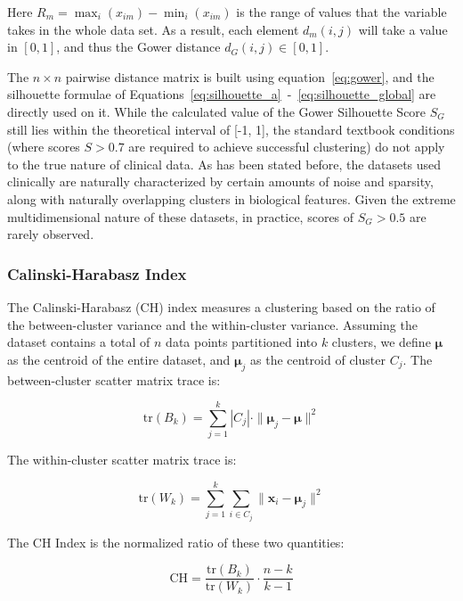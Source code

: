 Here $R_m=\max_i(x_{im})-\min_i(x_{im})$ is the range of values that the variable takes in the whole data set. As a result, each element $d_m(i,j)$ will take a value in $[0,1]$, and thus the Gower distance $d_G(i,j)\in[0,1]$.

The $n\times n$ pairwise distance matrix is built using equation~\eqref{eq:gower}, and the silhouette formulae of Equations~\eqref{eq:silhouette_a}~-~\eqref{eq:silhouette_global} are directly used on it. While the calculated value of the Gower Silhouette Score $S_G$ still lies within the theoretical interval of [-1, 1], the standard textbook conditions (where scores $S > 0.7$ are required to achieve successful clustering) do not apply to the true nature of clinical data. As has been stated before, the datasets used clinically are naturally characterized by certain amounts of noise and sparsity, along with naturally overlapping clusters in biological features. Given the extreme multidimensional nature of these datasets, in practice, scores of $S_G > 0.5$ are rarely observed.

\subsubsection*{Calinski-Harabasz Index}

The Calinski-Harabasz (CH) index \cite{calinski1974} measures a clustering based on the ratio of the between-cluster variance and the within-cluster variance. Assuming the dataset contains a total of $n$ data points partitioned into $k$ clusters, we define $\boldsymbol{\mu}$ as the centroid of the entire dataset, and $\boldsymbol{\mu}_j$ as the centroid of cluster $C_j$. The between-cluster scatter matrix trace is:

\begin{equation}
    \mathrm{tr}(B_k) = \sum_{j=1}^{k} |C_j| \cdot \|\boldsymbol{\mu}_j - \boldsymbol{\mu}\|^2
    \label{eq:ch_between}
\end{equation}

The within-cluster scatter matrix trace is:

\begin{equation}
    \mathrm{tr}(W_k) = \sum_{j=1}^{k} \sum_{i \in C_j} \|\mathbf{x}_i - \boldsymbol{\mu}_j\|^2
    \label{eq:ch_within}
\end{equation}

The CH Index is the normalized ratio of these two quantities:

\begin{equation}
    \mathrm{CH} = \frac{\mathrm{tr}(B_k)}{\mathrm{tr}(W_k)} \cdot \frac{n - k}{k - 1}
    \label{eq:ch}
\end{equation}


